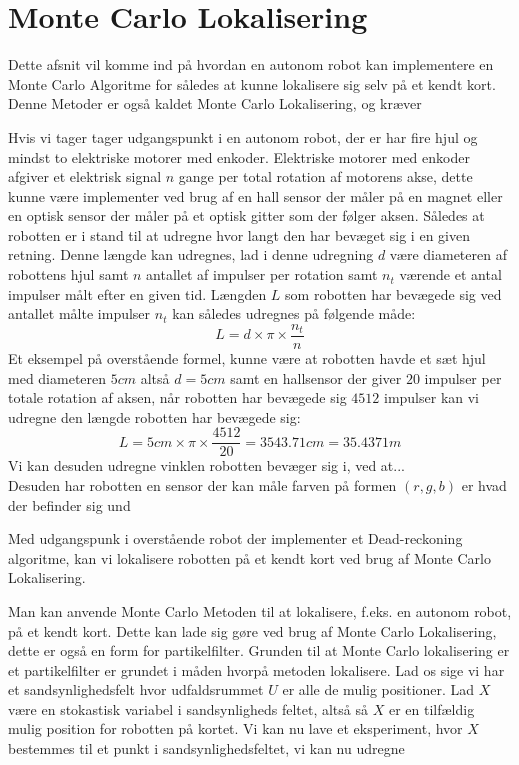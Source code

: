 \documentclass[../../SRP.tex]{subfiles}
\begin{document}
\chapter{Monte Carlo Lokalisering}
Dette afsnit vil komme ind på hvordan en autonom robot kan implementere en Monte Carlo Algoritme for således at kunne lokalisere sig selv på et kendt kort. Denne Metoder er også kaldet Monte Carlo Lokalisering, og kræver  

Hvis vi tager tager udgangspunkt i en autonom robot, der er har fire hjul og mindst to elektriske motorer med enkoder. Elektriske motorer med enkoder afgiver et elektrisk signal $n$ gange per total rotation af motorens akse, dette kunne være implementer ved brug af en hall sensor der måler på en magnet eller en optisk sensor der måler på et optisk gitter som der følger aksen. Således at robotten er i stand til at udregne hvor langt den har bevæget sig i en given retning. Denne længde kan udregnes, lad i denne udregning $d$ være diameteren af robottens hjul samt $n$ antallet af impulser per rotation samt $n_t$ værende et antal impulser målt efter en given tid. Længden $L$ som robotten har bevægede sig ved antallet målte impulser $n_t$ kan således udregnes på følgende måde:
\begin{equation}
  L = d \times \pi \times \frac{n_t}{n}
\end{equation}
Et eksempel på overstående formel, kunne være at robotten havde et sæt hjul med diameteren $5cm$ altså $d = 5cm$ samt en hallsensor der giver $20$ impulser per totale rotation af aksen, når robotten har bevægede sig $4512$ impulser kan vi udregne den længde robotten har bevægede sig:
\begin{equation}
  L = 5cm \times \pi \times \frac{4512}{20} = 3543.71cm = 35.4371m
\end{equation}
Vi kan desuden udregne vinklen robotten bevæger sig i, ved at... \\

Desuden har robotten en sensor der kan måle farven på formen $(r,g,b)$ er hvad der befinder sig und

Med udgangspunk i overstående robot der implementer et Dead-reckoning algoritme, kan vi lokalisere robotten på et kendt kort ved brug af Monte Carlo Lokalisering.

Man kan anvende Monte Carlo Metoden til at lokalisere, f.eks. en autonom robot, på et kendt kort. Dette kan lade sig gøre ved brug af Monte Carlo Lokalisering, dette er også en form for partikelfilter. Grunden til at Monte Carlo lokalisering er et partikelfilter er grundet i måden hvorpå metoden lokalisere. Lad os sige vi har et sandsynlighedsfelt hvor udfaldsrummet $U$ er alle de mulig positioner. Lad $X$ være en stokastisk variabel i sandsynligheds feltet, altså så $X$ er en tilfældig mulig position for robotten på kortet. Vi kan nu lave et eksperiment, hvor $X$ bestemmes til et punkt i sandsynlighedsfeltet, vi kan nu udregne 
\end{document}
